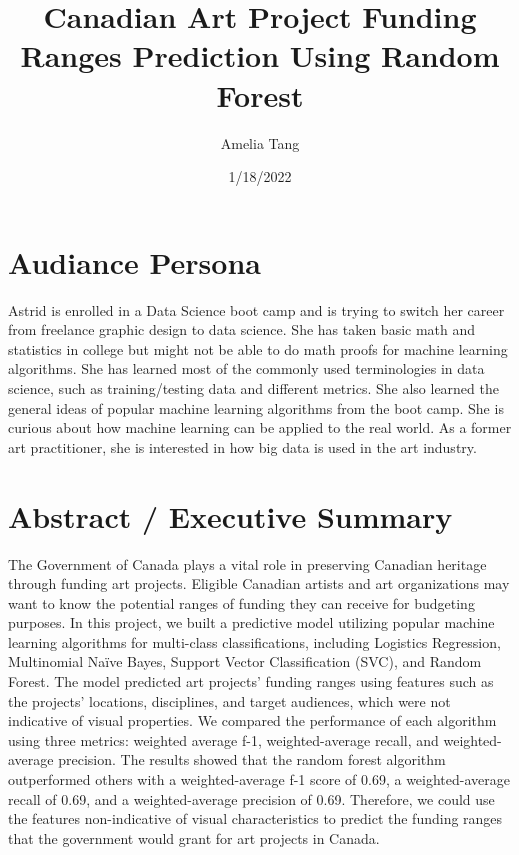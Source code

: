 \documentclass[
]{article}
\title{Canadian Art Project Funding Ranges Prediction Using Random
Forest}
\author{Amelia Tang}
\date{1/18/2022}
\begin{document}
\maketitle

{
\setcounter{tocdepth}{2}
\tableofcontents
}
\hypertarget{audiance-persona}{%
\section{Audiance Persona}\label{audiance-persona}}

Astrid is enrolled in a Data Science boot camp and is trying to switch
her career from freelance graphic design to data science. She has taken
basic math and statistics in college but might not be able to do math
proofs for machine learning algorithms. She has learned most of the
commonly used terminologies in data science, such as training/testing
data and different metrics. She also learned the general ideas of
popular machine learning algorithms from the boot camp. She is curious
about how machine learning can be applied to the real world. As a former
art practitioner, she is interested in how big data is used in the art
industry.

\hypertarget{abstract-executive-summary}{%
\section{Abstract / Executive
Summary}\label{abstract-executive-summary}}

The Government of Canada plays a vital role in preserving Canadian
heritage through funding art projects. Eligible Canadian artists and art
organizations may want to know the potential ranges of funding they can
receive for budgeting purposes. In this project, we built a predictive
model utilizing popular machine learning algorithms for multi-class
classifications, including Logistics Regression, Multinomial Naïve
Bayes, Support Vector Classification (SVC), and Random Forest. The model
predicted art projects' funding ranges using features such as the
projects' locations, disciplines, and target audiences, which were not
indicative of visual properties. We compared the performance of each
algorithm using three metrics: weighted average f-1, weighted-average
recall, and weighted-average precision. The results showed that the
random forest algorithm outperformed others with a weighted-average f-1
score of 0.69, a weighted-average recall of 0.69, and a weighted-average
precision of 0.69. Therefore, we could use the features non-indicative
of visual characteristics to predict the funding ranges that the
government would grant for art projects in Canada.
\end{document}
